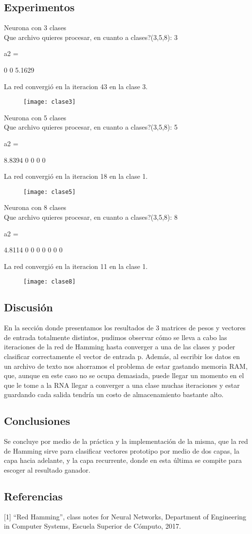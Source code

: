 \documentclass[]{article}
\begin{document}
\subsection{Experimentos}
Neurona con 3 clases\\
Que archivo quieres procesar, en cuanto a clases?(3,5,8): 3

a2 =

0
0
5.1629

La red convergió en la iteracion 43 en la clase 3.\\
\begin{figure}[H]
	\centering
	\texttt{[image: clase3]}
\end{figure}
Neurona con 5 clases\\
Que archivo quieres procesar, en cuanto a clases?(3,5,8): 5

a2 =

8.8394
0
0
0
0

La red convergió en la iteracion 18 en la clase 1.\\

\begin{figure}[H]
	\centering
	\texttt{[image: clase5]}
\end{figure}
Neurona con 8 clases\\
Que archivo quieres procesar, en cuanto a clases?(3,5,8): 8

a2 =

4.8114
0
0
0
0
0
0
0

La red convergió en la iteracion 11 en la clase 1.\\
\begin{figure}[H]
	\centering
	\texttt{[image: clase8]}
\end{figure}
\subsection{Discusión}
En la sección donde presentamos los resultados de 3 matrices de pesos y vectores de entrada
totalmente distintos, pudimos observar cómo se lleva a cabo las iteraciones de la red de Hamming
hasta converger a una de las clases y poder clasificar correctamente el vector de entrada p.
Además, al escribir los datos en un archivo de texto nos ahorramos el problema de estar gastando
memoria RAM, que, aunque en este caso no se ocupa demasiada, puede llegar un momento en el
que le tome a la RNA llegar a converger a una clase muchas iteraciones y estar guardando cada
salida tendría un costo de almacenamiento bastante alto.
\subsection{Conclusiones}
Se concluye por medio de la práctica y la implementación de la misma, que la red de Hamming sirve para clasificar vectores prototipo por medio de dos capas, la capa hacia adelante, y la capa recurrente, donde en esta última se compite para escoger al resultado ganador.
\subsection{Referencias}
[1] “Red Hamming”, class notes for Neural Networks, Department of Engineering in Computer
Systems, Escuela Superior de Cómputo, 2017.
\end{document}

